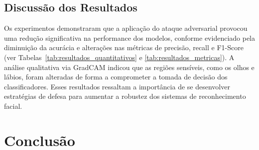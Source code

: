 \documentclass[12pt]{article}
\begin{document}
\subsection{Discussão dos Resultados}
Os experimentos demonstraram que a aplicação do ataque adversarial provocou uma
redução significativa na performance dos modelos, conforme evidenciado pela
diminuição da acurácia e alterações nas métricas de precisão, recall e F1-Score
(ver Tabelas~\ref{tab:resultados_quantitativos} e
\ref{tab:resultados_metricas}). A análise qualitativa via GradCAM indicou que
as regiões sensíveis, como os olhos e lábios, foram alteradas de forma a
comprometer a tomada de decisão dos classificadores. Esses resultados ressaltam
a importância de se desenvolver estratégias de defesa para aumentar a robustez
dos sistemas de reconhecimento facial.

\section{Conclusão}



\nocite{*}
\end{document}
